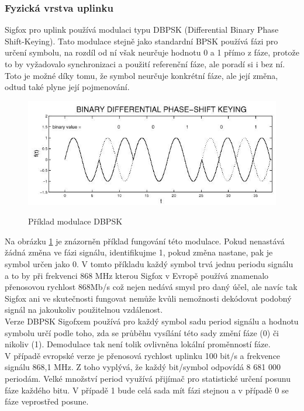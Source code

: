 \documentclass{ctuthesis}
\begin{document}
\subsubsection{Fyzická vrstva uplinku}
Sigfox pro uplink používá modulaci typu DBPSK (Differential Binary Phase Shift-Keying). Tato modulace stejně jako standardní BPSK používá fázi pro určení symbolu, na rozdíl od ní však neurčuje hodnotu 0 a 1 přímo z fáze, protože to by vyžadovalo synchronizaci a použití referenční fáze, ale poradí si i bez ní. Toto je možné díky tomu, že symbol neurčuje konkrétní fáze, ale její změna, odtud také plyne její pojmenování. \\
\begin{figure}
\caption{Příklad modulace DBPSK \cite{dbpsk}}
\includegraphics[width=1\textwidth]{./images/dbpsk.jpg}
\label{dbpsk}
\end{figure}
Na obrázku \ref{dbpsk} je znázorněn příklad fungování této modulace. Pokud nenastává žádná změna ve fázi signálu, identifikujme 1, pokud změna nastane, pak je symbol určen jako 0. V tomto příkladu každý symbol trvá jednu periodu signálu a to by při frekvenci 868 MHz kterou Sigfox v Evropě používá znamenalo přenosovou rychlost 868Mb/s což nejen nedává smysl pro daný účel, ale navíc tak Sigfox ani ve skutečnosti fungovat nemůže kvůli nemožnosti dekódovat podobný signál na jakoukoliv použitelnou vzdálenost.\\
Verze DBPSK Sigofxem používá pro každý symbol sadu period signálu a hodnotu symbolu určí podle toho, zda se průběhu vysílání této sady změní fáze (0) či nikoliv (1). Demodulace tak není tolik ovlivněna lokální proměnností fáze.\\
V případě evropské verze je přenosová rychlost uplinku 100 bit/s a frekvence signálu 868,1 MHz. Z toho vyplývá, že každý bit/symbol odpovídá 8 681 000 periodám. Velké množství period využívá přijímač pro statistické určení posunu fáze každého bitu. V případě 1 bude celá sada mít fázi stejnou a v případě 0 se fáze veprostřed posune. \\
\end{document}
